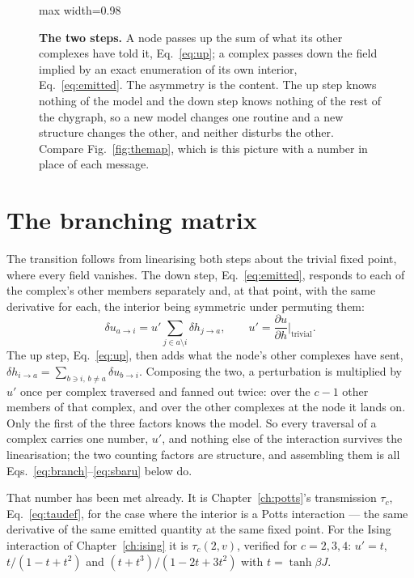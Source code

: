 \begin{figure}[t]
\begin{adjustbox}{max width=0.98\linewidth}
\end{adjustbox}
\caption{\textbf{The two steps.} A node passes up the sum of what its other
complexes have told it, Eq.~\eqref{eq:up}; a complex passes down the field
implied by an exact enumeration of its own interior, Eq.~\eqref{eq:emitted}.
The asymmetry is the content. The up step knows nothing of the model and the
down step knows nothing of the rest of the chygraph, so a new model changes one
routine and a new structure changes the other, and neither disturbs the other.
Compare Fig.~\ref{fig:themap}, which is this picture with a number in place of
each message.}
\label{fig:twosteps}
\end{figure}

\section{The branching matrix}
\label{sec:branching}

The transition follows from linearising both steps about the trivial fixed
point, where every field vanishes. The down step, Eq.~\eqref{eq:emitted},
responds to each of the complex's other members separately and, at that point,
with the same derivative for each, the interior being symmetric under permuting
them:
\begin{equation}
  \delta u_{a\to i}=u'\!\!\sum_{j\in a\setminus i}\!\delta h_{j\to a},
  \qquad
  u'=\frac{\partial u}{\partial h}\bigg|_{\text{trivial}}.
  \label{eq:uprime}
\end{equation}
The up step, Eq.~\eqref{eq:up}, then adds what the node's other complexes have
sent, $\delta h_{i\to a}=\sum_{b\ni i,\,b\ne a}\delta u_{b\to i}$. Composing
the two, a perturbation is multiplied by $u'$ once per complex traversed and
fanned out twice: over the $c-1$ other members of that complex, and over the
other complexes at the node it lands on. Only the first of the three factors
knows the model. So every traversal of a complex carries one number, $u'$, and
nothing else of the interaction survives the linearisation; the two counting
factors are structure, and assembling them is all
Eqs.~\eqref{eq:branch}--\eqref{eq:sbaru} below do.

That number has been met already. It is Chapter~\ref{ch:potts}'s transmission
$\tau_{c}$, Eq.~\eqref{eq:taudef}, for the case where the interior is a Potts
interaction --- the same derivative of the same emitted quantity at the same
fixed point. For the Ising interaction of Chapter~\ref{ch:ising} it is
$\tau_{c}(2,v)$, verified for $c=2,3,4$: $u'=t$, $t/(1-t+t^{2})$ and
$(t+t^{3})/(1-2t+3t^{2})$ with $t=\tanh\beta J$.

